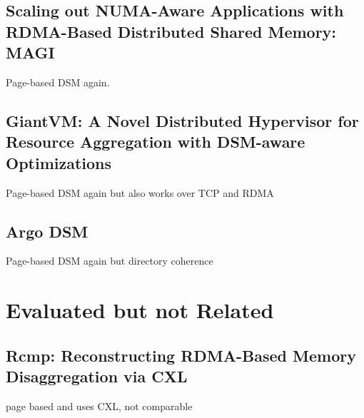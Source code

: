 \documentclass[sigplan,nonacm]{acmart}
\begin{document}
\subsection{Scaling out NUMA-Aware Applications with RDMA-Based Distributed Shared Memory: MAGI}
Page-based DSM again. \cite{Hong-JCST-2019}


\subsection {GiantVM: A Novel Distributed Hypervisor for Resource Aggregation with DSM-aware Optimizations}
Page-based DSM again but also works over TCP and RDMA\cite{Jia-ACO-2022}


\subsection{Argo DSM}
Page-based DSM again but directory coherence




\section{Evaluated but not Related}
\subsection{Rcmp: Reconstructing RDMA-Based Memory Disaggregation via CXL}
page based and uses CXL, not comparable\cite{Wang-ACO-2024}




\end{document}
